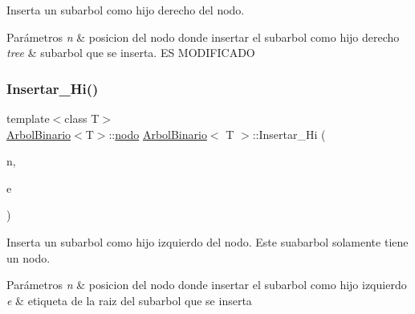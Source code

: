 Inserta un subarbol como hijo derecho del nodo. 


\begin{DoxyParams}{Parámetros}
{\em n} & posicion del nodo donde insertar el subarbol como hijo derecho \\
\hline
{\em tree} & subarbol que se inserta. ES M\+O\+D\+I\+F\+I\+C\+A\+DO \\
\hline
\end{DoxyParams}
\mbox{\label{classArbolBinario_a82155da74eeeac7e52b9b0cc2f2d05f2}} 
\subsubsection{\texorpdfstring{Insertar\+\_\+\+Hi()}{Insertar\_Hi()}\hspace{0.1cm}{\footnotesize\ttfamily [1/2]}}
{\footnotesize\ttfamily template$<$class T$>$ \\
\hyperlink{classArbolBinario}{Arbol\+Binario}$<$T$>$\+::\hyperlink{classArbolBinario_1_1nodo}{nodo} \hyperlink{classArbolBinario}{Arbol\+Binario}$<$ T $>$\+::Insertar\+\_\+\+Hi (\begin{DoxyParamCaption}\item[{typename \hyperlink{classArbolBinario}{Arbol\+Binario}$<$ T $>$\+::\hyperlink{classArbolBinario_1_1nodo}{nodo}}]{n,  }\item[{const T \&}]{e }\end{DoxyParamCaption})}



Inserta un subarbol como hijo izquierdo del nodo. Este suabarbol solamente tiene un nodo. 


\begin{DoxyParams}{Parámetros}
{\em n} & posicion del nodo donde insertar el subarbol como hijo izquierdo \\
\hline
{\em e} & etiqueta de la raiz del subarbol que se inserta \\
\hline
\end{DoxyParams}
\mbox{\label{classArbolBinario_aa917f4b80d735b3494e1793de9457fb4}} 
